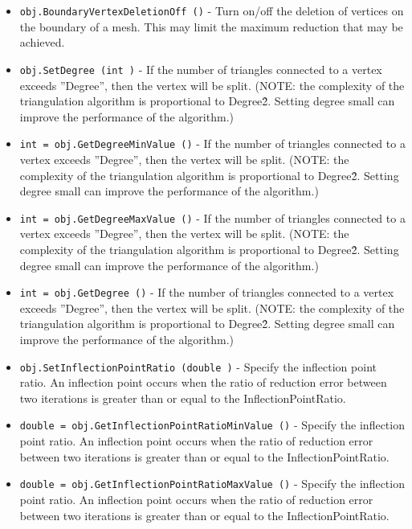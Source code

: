 \begin{itemize}
\item  \verb|obj.BoundaryVertexDeletionOff ()| -  Turn on/off the deletion of vertices on the boundary of a mesh. This
 may limit the maximum reduction that may be achieved.

\item  \verb|obj.SetDegree (int )| -  If the number of triangles connected to a vertex exceeds ''Degree'', then
 the vertex will be split. (NOTE: the complexity of the triangulation
 algorithm is proportional to Degree\^2. Setting degree small can improve
 the performance of the algorithm.)

\item  \verb|int = obj.GetDegreeMinValue ()| -  If the number of triangles connected to a vertex exceeds ''Degree'', then
 the vertex will be split. (NOTE: the complexity of the triangulation
 algorithm is proportional to Degree\^2. Setting degree small can improve
 the performance of the algorithm.)

\item  \verb|int = obj.GetDegreeMaxValue ()| -  If the number of triangles connected to a vertex exceeds ''Degree'', then
 the vertex will be split. (NOTE: the complexity of the triangulation
 algorithm is proportional to Degree\^2. Setting degree small can improve
 the performance of the algorithm.)

\item  \verb|int = obj.GetDegree ()| -  If the number of triangles connected to a vertex exceeds ''Degree'', then
 the vertex will be split. (NOTE: the complexity of the triangulation
 algorithm is proportional to Degree\^2. Setting degree small can improve
 the performance of the algorithm.)

\item  \verb|obj.SetInflectionPointRatio (double )| -  Specify the inflection point ratio. An inflection point occurs
 when the ratio of reduction error between two iterations is greater
 than or equal to the InflectionPointRatio.

\item  \verb|double = obj.GetInflectionPointRatioMinValue ()| -  Specify the inflection point ratio. An inflection point occurs
 when the ratio of reduction error between two iterations is greater
 than or equal to the InflectionPointRatio.

\item  \verb|double = obj.GetInflectionPointRatioMaxValue ()| -  Specify the inflection point ratio. An inflection point occurs
 when the ratio of reduction error between two iterations is greater
 than or equal to the InflectionPointRatio.


\end{itemize}
